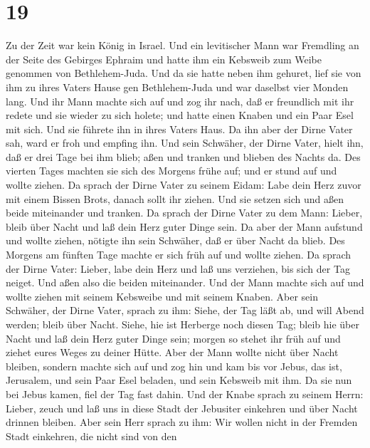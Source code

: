 \hypertarget{section-18}{%
\section{19}\label{section-18}}

 Zu der Zeit war kein König in Israel. Und ein levitischer
Mann war Fremdling an der Seite des Gebirges Ephraim und hatte ihm ein
Kebsweib zum Weibe genommen von Bethlehem-Juda.  Und da sie
hatte neben ihm gehuret, lief sie von ihm zu ihres Vaters Hause gen
Bethlehem-Juda und war daselbst vier Monden lang.  Und ihr
Mann machte sich auf und zog ihr nach, daß er freundlich mit ihr redete
und sie wieder zu sich holete; und hatte einen Knaben und ein Paar Esel
mit sich. Und sie führete ihn in ihres Vaters Haus. Da ihn aber der
Dirne Vater sah, ward er froh und empfing ihn.  Und sein
Schwäher, der Dirne Vater, hielt ihn, daß er drei Tage bei ihm blieb;
aßen und tranken und blieben des Nachts da.  Des vierten
Tages machten sie sich des Morgens frühe auf; und er stund auf und
wollte ziehen. Da sprach der Dirne Vater zu seinem Eidam: Labe dein Herz
zuvor mit einem Bissen Brots, danach sollt ihr ziehen.  Und
sie setzen sich und aßen beide miteinander und tranken. Da sprach der
Dirne Vater zu dem Mann: Lieber, bleib über Nacht und laß dein Herz
guter Dinge sein.  Da aber der Mann aufstund und wollte
ziehen, nötigte ihn sein Schwäher, daß er über Nacht da blieb.
 Des Morgens am fünften Tage machte er sich früh auf und
wollte ziehen. Da sprach der Dirne Vater: Lieber, labe dein Herz und laß
uns verziehen, bis sich der Tag neiget. Und aßen also die beiden
miteinander.  Und der Mann machte sich auf und wollte ziehen
mit seinem Kebsweibe und mit seinem Knaben. Aber sein Schwäher, der
Dirne Vater, sprach zu ihm: Siehe, der Tag läßt ab, und will Abend
werden; bleib über Nacht. Siehe, hie ist Herberge noch diesen Tag; bleib
hie über Nacht und laß dein Herz guter Dinge sein; morgen so stehet ihr
früh auf und ziehet eures Weges zu deiner Hütte.  Aber der
Mann wollte nicht über Nacht bleiben, sondern machte sich auf und zog
hin und kam bis vor Jebus, das ist, Jerusalem, und sein Paar Esel
beladen, und sein Kebsweib mit ihm.  Da sie nun bei Jebus
kamen, fiel der Tag fast dahin. Und der Knabe sprach zu seinem Herrn:
Lieber, zeuch und laß uns in diese Stadt der Jebusiter einkehren und
über Nacht drinnen bleiben.  Aber sein Herr sprach zu ihm:
Wir wollen nicht in der Fremden Stadt einkehren, die nicht sind von den
